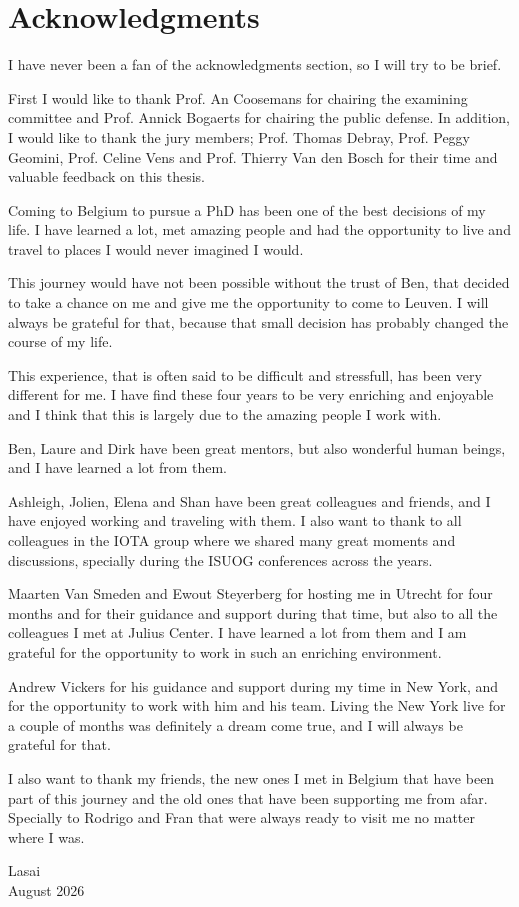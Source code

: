 \chapter*{Acknowledgments}

I have never been a fan of the acknowledgments section, so I will try to be brief.

First I would like to thank Prof. An Coosemans for chairing the examining committee and Prof. Annick Bogaerts for chairing the public defense. In addition, I would like to thank the jury members; Prof. Thomas Debray, Prof. Peggy Geomini, Prof. Celine Vens and Prof. Thierry Van den Bosch for their time and valuable feedback on this thesis.

Coming to Belgium to pursue a PhD has been one of the best decisions of my life. I have learned a lot, met amazing people and had the opportunity to live and travel to places I would never imagined I would. 

This journey would have not been possible without the trust of Ben, that decided to take a chance on me and give me the opportunity to come to Leuven. I will always be grateful for that, because that small decision has probably changed the course of my life. 

This experience, that is often said to be difficult and stressfull, has been very different for me. I have find these four years to be very enriching and enjoyable and I think that this is largely due to the amazing people I work with. 

Ben, Laure and Dirk have been great mentors, but also wonderful human beings, and I have learned a lot from them. 

Ashleigh, Jolien, Elena and Shan have been great colleagues and friends, and I have enjoyed working and traveling with them. I also want to thank to all colleagues in the IOTA group where we shared many great moments and discussions, specially during the ISUOG conferences across the years. 

Maarten Van Smeden and Ewout Steyerberg for hosting me in Utrecht for four months and for their guidance and support during that time, but also to all the colleagues I met at Julius Center. I have learned a lot from them and I am grateful for the opportunity to work in such an enriching environment.

Andrew Vickers for his guidance and support during my time in New York, and for the opportunity to work with him and his team. Living the New York live for a couple of months was definitely a dream come true, and I will always be grateful for that.

 I also want to thank my friends, the new ones I met in Belgium that have been part of this journey and the old ones that have been supporting me from afar. Specially to Rodrigo and Fran that were always ready to visit me no matter where I was. 







{\raggedleft
Lasai \\
August 2026 \\
}